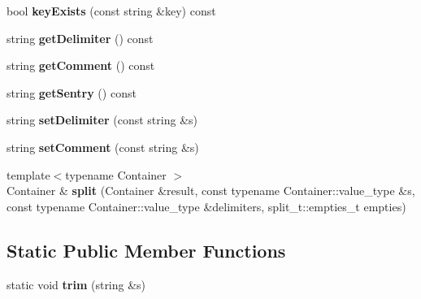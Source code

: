 \begin{DoxyCompactItemize}
\item 
\hypertarget{classConfigFile_afd3d1146ae212a7e5802961f5ad3fe91}{bool {\bfseries key\+Exists} (const string \&key) const }\label{classConfigFile_afd3d1146ae212a7e5802961f5ad3fe91}

\item 
\hypertarget{classConfigFile_adcc1df41c7d669a7cc81c47b85b0ee14}{string {\bfseries get\+Delimiter} () const }\label{classConfigFile_adcc1df41c7d669a7cc81c47b85b0ee14}

\item 
\hypertarget{classConfigFile_a2b0cd50789ea83b1a12bf39293c7401a}{string {\bfseries get\+Comment} () const }\label{classConfigFile_a2b0cd50789ea83b1a12bf39293c7401a}

\item 
\hypertarget{classConfigFile_adf270b0cf2a1b034fc18fd2e82296760}{string {\bfseries get\+Sentry} () const }\label{classConfigFile_adf270b0cf2a1b034fc18fd2e82296760}

\item 
\hypertarget{classConfigFile_af28390aba7d8f399ac734c074e659b99}{string {\bfseries set\+Delimiter} (const string \&s)}\label{classConfigFile_af28390aba7d8f399ac734c074e659b99}

\item 
\hypertarget{classConfigFile_a2e06b3000fb45426c975b334b2cee148}{string {\bfseries set\+Comment} (const string \&s)}\label{classConfigFile_a2e06b3000fb45426c975b334b2cee148}

\item 
\hypertarget{classConfigFile_a60f63a6d5c0019405527d98ba222c3b0}{{\footnotesize template$<$typename Container $>$ }\\Container \& {\bfseries split} (Container \&result, const typename Container\+::value\+\_\+type \&s, const typename Container\+::value\+\_\+type \&delimiters, split\+\_\+t\+::empties\+\_\+t empties)}\label{classConfigFile_a60f63a6d5c0019405527d98ba222c3b0}

\end{DoxyCompactItemize}
\subsection*{Static Public Member Functions}
\begin{DoxyCompactItemize}
\item 
\hypertarget{classConfigFile_a6b445b393fcf42386a804fc4077fac10}{static void {\bfseries trim} (string \&s)}\label{classConfigFile_a6b445b393fcf42386a804fc4077fac10}

\end{DoxyCompactItemize}
